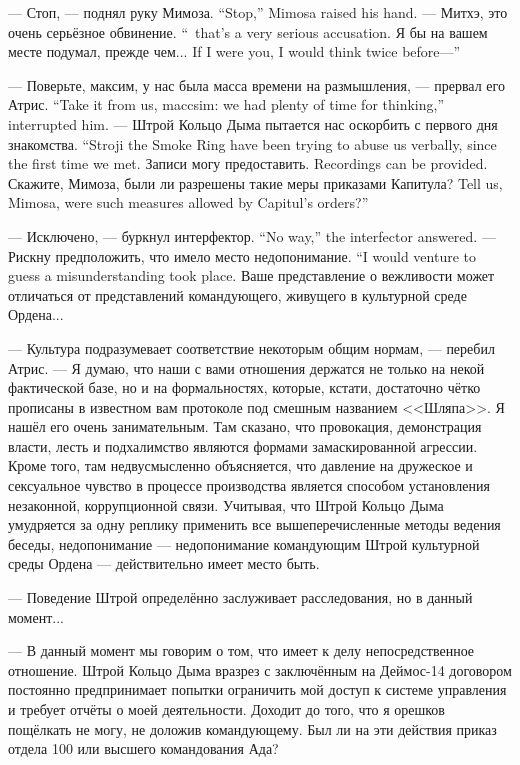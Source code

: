 {--- Стоп, --- поднял руку Мимоза.}
{``Stop,'' Mimosa raised his hand.}
{--- Митхэ, это очень серьёзное обвинение.}
{``\Mitchoe\, that's a very serious accusation.}
{Я бы на вашем месте подумал, прежде чем...}
{If I were you, I would think twice before---''}

{--- Поверьте, максим, у нас была масса времени на размышления, --- прервал его Атрис.}
{``Take it from us, maccsim: we had plenty of time for thinking,'' \Aatris{} interrupted him.}
{--- Штрой Кольцо Дыма пытается нас оскорбить с первого дня знакомства.}
{``Stroji the Smoke Ring have been trying to abuse us verbally, since the first time we met.}
{Записи могу предоставить.}
{Recordings can be provided.}
{Скажите, Мимоза, были ли разрешены такие меры приказами Капитула?}
{Tell us, Mimosa, were such measures allowed by Capitul's orders?''}

{--- Исключено, --- буркнул интерфектор.}
{``No way,'' the interfector answered.}
{--- Рискну предположить, что имело место недопонимание.}
{``I would venture to guess a misunderstanding took place.}
Ваше представление о вежливости может отличаться от представлений командующего, живущего в культурной среде Ордена...

--- Культура подразумевает соответствие некоторым общим нормам, --- перебил Атрис.
--- Я думаю, что наши с вами отношения держатся не только на некой фактической базе, но и на формальностях, которые, кстати, достаточно чётко прописаны в известном вам протоколе под смешным названием <<Шляпа>>.
Я нашёл его очень занимательным.
Там сказано, что провокация, демонстрация власти, лесть и подхалимство являются формами замаскированной агрессии.
Кроме того, там недвусмысленно объясняется, что давление на дружеское и сексуальное чувство в процессе производства является способом установления незаконной, коррупционной связи.
Учитывая, что Штрой Кольцо Дыма умудряется за одну реплику применить все вышеперечисленные методы ведения беседы, недопонимание --- недопонимание командующим Штрой культурной среды Ордена --- действительно имеет место быть.

--- Поведение Штрой определённо заслуживает расследования, но в данный момент...

--- В данный момент мы говорим о том, что имеет к делу непосредственное отношение.
Штрой Кольцо Дыма вразрез с заключённым на Деймос-14 договором постоянно предпринимает попытки ограничить мой доступ к системе управления и требует отчёты о моей деятельности.
Доходит до того, что я орешков пощёлкать не могу, не доложив командующему.
Был ли на эти действия приказ отдела 100 или высшего командования Ада?

